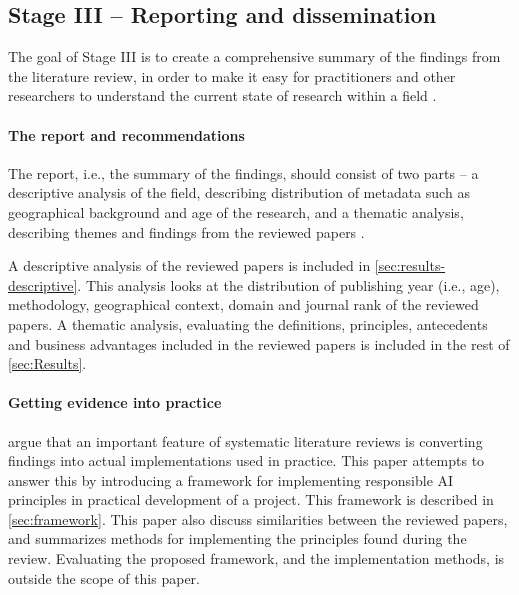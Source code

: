 \subsection{Stage III -- Reporting and dissemination}
The goal of Stage III is to create a comprehensive summary of the findings from the literature review, in order to make it easy for practitioners and other researchers to understand the current state of research within a field \parencite{Tranfield_2003}.

\paragraph{The report and recommendations}
The report, i.e., the summary of the findings, should consist of two parts -- a descriptive analysis of the field, describing distribution of metadata such as geographical background and age of the research, and a thematic analysis, describing themes and findings from the reviewed papers \parencite{Tranfield_2003}.

A descriptive analysis of the reviewed papers is included in \autoref{sec:results-descriptive}. This analysis looks at the distribution of publishing year (i.e., age), methodology, geographical context, domain and journal rank of the reviewed papers. A thematic analysis, evaluating the definitions, principles, antecedents and business advantages included in the reviewed papers is included in the rest of \autoref{sec:Results}.


\paragraph{Getting evidence into practice}
\textcite{Tranfield_2003} argue that an important feature of systematic literature reviews is converting findings into actual implementations used in practice. This paper attempts to answer this by introducing a framework for implementing responsible AI principles in practical development of a project. This framework is described in \autoref{sec:framework}. This paper also discuss similarities between the reviewed papers, and summarizes methods for implementing the principles found during the review. Evaluating the proposed framework, and the implementation methods, is outside the scope of this paper.
